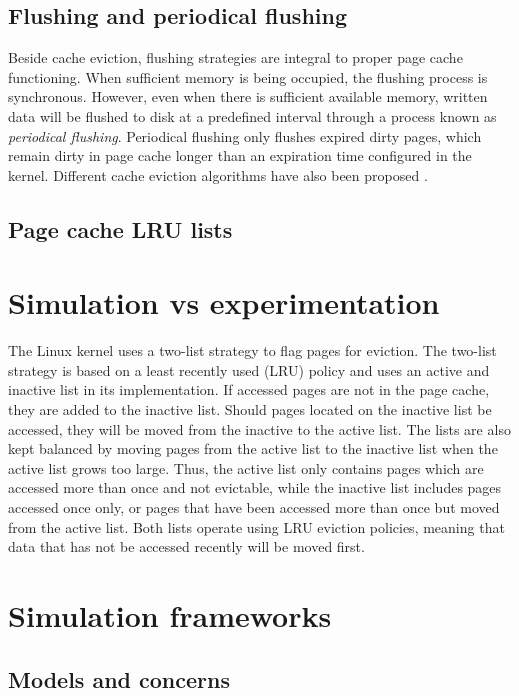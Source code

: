 \subsection{Flushing and periodical flushing}

Beside cache eviction, flushing strategies are integral to proper page cache functioning.
When sufficient memory is being occupied, the flushing process is synchronous. 
However, even when there is sufficient available memory, written data will be 
flushed to disk at a predefined interval through a process known as 
\textit{periodical flushing}.
Periodical flushing only flushes expired dirty pages, which remain dirty in
page cache longer than an expiration time configured in the kernel.
Different cache eviction algorithms have also been proposed
\cite{owda2014comparison}.

\subsection{Page cache LRU lists}

\section{Simulation vs experimentation}

The Linux kernel uses a two-list strategy to flag pages for eviction.
The two-list strategy is based on a least recently used (LRU) policy
and uses an active and inactive list in its implementation.
If accessed pages are not in the page cache, they are added to the inactive list.
Should pages located on the inactive list be accessed, they will be moved from
the inactive to the active list.
The lists are also kept balanced by moving pages from the active list
to the inactive list when the active list grows too large.
Thus, the active list only contains pages which are accessed more than once
and not evictable, while the inactive list includes pages accessed once only,
or pages that have been accessed more than once but moved from the active list.
Both lists operate using LRU eviction policies, meaning that data that has
not be accessed recently will be moved first.

\section{Simulation frameworks}

\subsection{Models and concerns}

